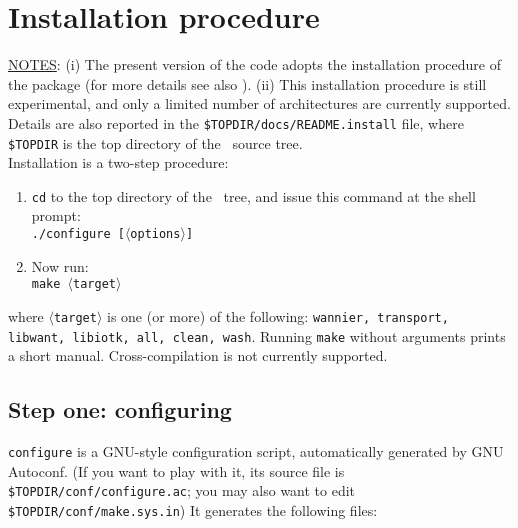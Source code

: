 
\thispagestyle{empty}
\section{Installation procedure}\label{section:install}

\noindent \underline {NOTES}: (i) The present version of the code
adopts the installation procedure of the \PWSCF package (for more details see
also \PWSCFURL). (ii) This installation procedure is still
experimental, and only a limited number of architectures are
currently supported.
Details are also reported in the {\tt \$TOPDIR/docs/README.install} file,
where {\tt \$TOPDIR} is the top directory of the \WANT\ source tree. \\

\noindent Installation is a two-step procedure:
%
%
\begin{enumerate}
\item \texttt{cd} to the top directory of the \WANT\ tree,
and issue this command at the shell
prompt:\\
{\tt ./configure [$\langle$options$\rangle$] }
\item Now run:\\
     {\tt make $\langle$target$\rangle$ }
\end{enumerate}
%
%
where {\tt $\langle$target$\rangle$} is one (or more) of the following:
{\tt wannier, transport, libwant, libiotk, all, clean, wash}. Running
{\tt make} without arguments prints a short manual.
Cross-compilation is not currently supported.


\subsection{Step one: configuring} {\tt configure} is a GNU-style configuration script,
automatically generated by GNU Autoconf.  (If you want to play
with it, its source file is {\tt \$TOPDIR/conf/configure.ac}; you may also
want to edit {\tt \$TOPDIR/conf/make.sys.in})  It generates the following
files: \\


